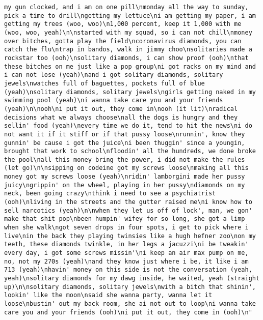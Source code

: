 \documentclass[]{article}
\begin{document}
\begin{verbatim}
my gun clocked, and i am on one pill\nmonday all the way to sunday, pick a time to drill\ngetting my lettuce\ni am getting my paper, i am getting my trees (woo, woo)\n1,000 percent, keep it 1,000 with me (woo, woo, yeah)\n\nstarted with my squad, so i can not chill\nmoney over bitches, gotta play the field\ncoronavirus diamonds, you can catch the flu\ntrap in bandos, walk in jimmy choo\nsolitaries made a rockstar too (ooh)\nsolitary diamonds, i can show proof (ooh)\nthat these bitches on me just like a pop group\ni got racks on my mind and i can not lose (yeah)\nand i got solitary diamonds, solitary jewels\nwatches full of baguettes, pockets full of blue (yeah)\nsolitary diamonds, solitary jewels\ngirls getting naked in my swimming pool (yeah)\ni wanna take care you and your friends (yeah)\n\nooh\ni put it out, they come in\nooh (it lit)\nradical decisions what we always choose\nall the dogs is hungry and they sellin' food (yeah)\nevery time we do it, tend to hit the news\ni do not want it if it stiff or if that pussy loose\nrunnin', know they gunnin' be cause i got the juice\ni been thuggin' since a youngin, brought that work to school\nfloodin' all the hundreds, we done broke the pool\nall this money bring the power, i did not make the rules (let go)\n\nsipping on codeine got my screws loose\nmaking all this money got my screws loose (yeah)\nridin' lamborgini made her pussy juicy\ngrippin' on the wheel, playing in her pussy\ndiamonds on my neck, been going crazy\nthink i need to see a psychiatrist (ooh)\nliving in the streets and the gutter raised me\ni know how to sell narcotics (yeah)\n\nwhen they let us off of lock', man, we gon' make that shit pop\nbeen humpin' wifey for so long, she got a limp when she walk\ngot seven drops in four spots, i get to pick where i live\nin the back they playing twinsies like a hugh hefner zoo\non my teeth, these diamonds twinkle, in her legs a jacuzzi\ni be tweakin' every day, i got some screws missin'\ni keep an air max pump on me, no, not my 270s (yeah)\nand they know just where i be, it like i am 713 (yeah)\nhavin' money on this side is not the conversation (yeah, yeah)\nsolitary diamonds for my dawg inside, he waited, yeah (straight up)\n\nsolitary diamonds, solitary jewels\nwith a bitch that shinin', lookin' like the moon\nsaid she wanna party, wanna let it loose\nbustin' out my back room, she ai not out to loop\ni wanna take care you and your friends (ooh)\ni put it out, they come in (ooh)\n"                                                                                                                                                                                                                                                                                                                                                                                                                 

\end{verbatim}
\end{document}

